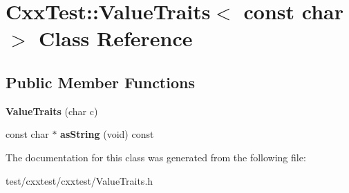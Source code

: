 \hypertarget{classCxxTest_1_1ValueTraits_3_01const_01char_01_4}{\section{Cxx\-Test\-:\-:Value\-Traits$<$ const char $>$ Class Reference}
\label{classCxxTest_1_1ValueTraits_3_01const_01char_01_4}
}
\subsection*{Public Member Functions}
\begin{DoxyCompactItemize}
\item 
\hypertarget{classCxxTest_1_1ValueTraits_3_01const_01char_01_4_af39bb7dff864fd660f79a3d05680c32a}{{\bfseries Value\-Traits} (char c)}\label{classCxxTest_1_1ValueTraits_3_01const_01char_01_4_af39bb7dff864fd660f79a3d05680c32a}

\item 
\hypertarget{classCxxTest_1_1ValueTraits_3_01const_01char_01_4_a87dcb6e4fef8ea5e8561f599576bfea5}{const char $\ast$ {\bfseries as\-String} (void) const }\label{classCxxTest_1_1ValueTraits_3_01const_01char_01_4_a87dcb6e4fef8ea5e8561f599576bfea5}

\end{DoxyCompactItemize}


The documentation for this class was generated from the following file\-:\begin{DoxyCompactItemize}
\item 
test/cxxtest/cxxtest/Value\-Traits.\-h\end{DoxyCompactItemize}
